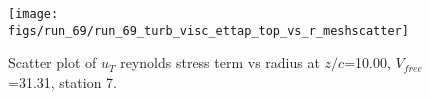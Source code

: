 \begin{figure}[H]
\centering
\texttt{[image: figs/run\_69/run\_69\_turb\_visc\_ettap\_top\_vs\_r\_meshscatter]}
\caption{Scatter plot of $
u_T$ reynolds stress term vs radius at $z/c$=10.00, $V_{free}$=31.31, station 7.}
\end{figure}


